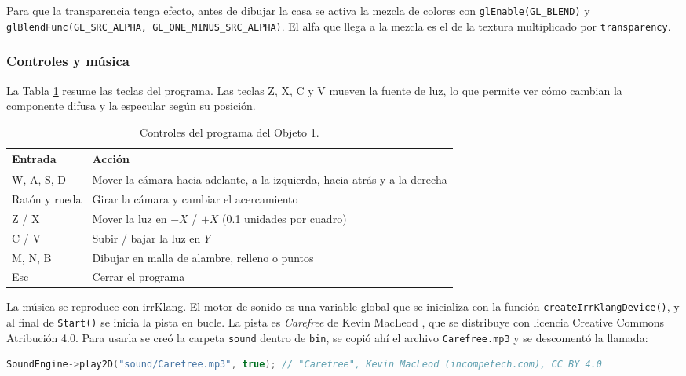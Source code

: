 Para que la transparencia tenga efecto, antes de dibujar la casa se activa la mezcla de colores con \texttt{glEnable(GL\_BLEND)} y \texttt{glBlendFunc(GL\_SRC\_ALPHA, GL\_ONE\_MINUS\_SRC\_ALPHA)}. El alfa que llega a la mezcla es el de la textura multiplicado por \texttt{transparency}.

\subsubsection{Controles y música}
La Tabla \ref{tab:controles} resume las teclas del programa. Las teclas Z, X, C y V mueven la fuente de luz, lo que permite ver cómo cambian la componente difusa y la especular según su posición.

\begin{table}[H]
\centering
\renewcommand{\arraystretch}{1.2}
\begin{tabular}{|p{3.2cm}|p{11.5cm}|}
\hline
\textbf{Entrada} & \textbf{Acción} \\ \hline
W, A, S, D & Mover la cámara hacia adelante, a la izquierda, hacia atrás y a la derecha \\ \hline
Ratón y rueda & Girar la cámara y cambiar el acercamiento \\ \hline
Z / X & Mover la luz en $-X$ / $+X$ (0.1 unidades por cuadro) \\ \hline
C / V & Subir / bajar la luz en $Y$ \\ \hline
M, N, B & Dibujar en malla de alambre, relleno o puntos \\ \hline
Esc & Cerrar el programa \\ \hline
\end{tabular}
\caption{Controles del programa del Objeto 1.}
\label{tab:controles}
\end{table}

La música se reproduce con irrKlang. El motor de sonido es una variable global que se inicializa con la función \texttt{createIrrKlangDevice()}, y al final de \texttt{Start()} se inicia la pista en bucle. La pista es \textit{Carefree} de Kevin MacLeod \cite{macleod_carefree}, que se distribuye con licencia Creative Commons Atribución 4.0. Para usarla se creó la carpeta \texttt{sound} dentro de \texttt{bin}, se copió ahí el archivo \texttt{Carefree.mp3} y se descomentó la llamada:

\begin{lstlisting}[language=C++, firstnumber=176, caption={Reproducción de la música de fondo en 07\_IllumModels.cpp.}, label={lst:musica}]
	SoundEngine->play2D("sound/Carefree.mp3", true); // "Carefree", Kevin MacLeod (incompetech.com), CC BY 4.0
\end{lstlisting}

